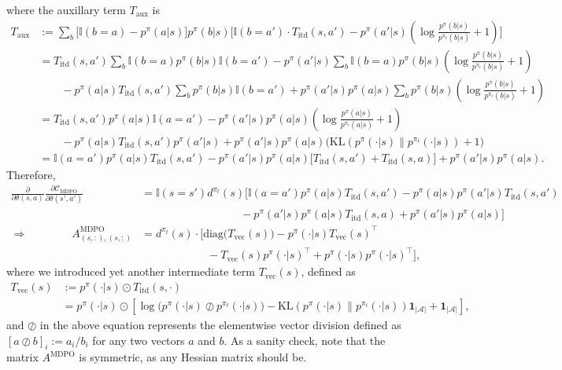 \documentclass[a4paper, 10pt]{article}
\begin{document}
where the auxillary term $T_{\text{aux}}$ is 
\begin{align}
  T_{\text{aux}} &:= \sum_b \Big[ \mathbb{I}(b = a) - p^\pi(a | s) \Big] p^\pi(b | s) \Bigg[ \mathbb{I}(b = a') \cdot T_{\text{itd}}(s, a') - p^\pi(a' | s) \left( \log \frac{p^\pi(b | s)}{p^{\pi_t}(b | s)} + 1 \right) \Bigg] \\
  &= T_{\text{itd}}(s, a') \sum_{b} \mathbb{I}(b = a) p^\pi(b | s) \mathbb{I}(b = a') - p^\pi(a' | s) \sum_{b} \mathbb{I}(b = a) p^\pi(b | s) \left( \log \frac{p^\pi(b | s)}{p^{\pi_t}(b | s)} + 1 \right) \nonumber \\
  & \qquad - p^\pi(a | s) T_{\text{itd}}(s, a') \sum_{b} p^\pi(b | s) \mathbb{I}(b = a') + p^\pi(a' | s) p^\pi(a | s) \sum_{b} p^\pi(b | s) \left( \log \frac{p^\pi(b | s)}{p^{\pi_t}(b | s)} + 1 \right) \nonumber \\  
  &= T_{\text{itd}}(s, a') p^\pi(a | s) \mathbb{I}(a = a') - p^\pi(a' | s) p^\pi(a | s) \left( \log \frac{p^\pi(a | s)}{p^{\pi_t}(a | s)} + 1 \right) \nonumber \\
  & \qquad - p^\pi(a | s) T_{\text{itd}}(s, a') p^\pi(a' | s) + p^\pi(a' | s) p^\pi(a | s) \Big( \text{KL}( p^\pi(\cdot | s) \| p^{\pi_t}(\cdot | s) ) + 1 \Big) \nonumber \\
  &= \mathbb{I}(a = a') p^\pi(a | s) T_{\text{itd}}(s, a') - p^\pi(a' | s) p^\pi(a | s) \Big[ T_{\text{itd}}(s, a') + T_{\text{itd}}(s, a) \Big] + p^\pi(a' | s) p^\pi(a | s).
\end{align}
Therefore, 
\begin{align}
  \frac{\partial}{\partial \theta(s, a)} \frac{\partial \mathcal{C}_{\text{MDPO}}}{\partial \theta(s', a')} &= \mathbb{I}(s = s') d^{\pi_t}(s) \bigg[ \mathbb{I}(a = a') p^\pi(a | s) T_{\text{itd}}(s, a') - p^\pi(a | s) p^\pi(a' | s) T_{\text{itd}}(s, a') \nonumber \\
    & \qquad \qquad \qquad \qquad \quad - p^\pi(a' | s) p^\pi(a | s) T_{\text{itd}}(s, a) + p^\pi(a' | s) p^\pi(a | s) \bigg] \\
  \Rightarrow \qquad \qquad A^{\text{MDPO}}_{(s, :), (s, :)} &= d^{\pi_t}(s) \cdot \Big[ \text{diag} \big( T_{\text{vec}}(s) \big) - p^{\pi}(\cdot | s) T_{\text{vec}}(s)^\top \nonumber \\
    & \qquad \qquad \qquad - T_{\text{vec}}(s) p^{\pi}(\cdot | s)^\top + p^{\pi}(\cdot | s) p^{\pi}(\cdot | s)^\top \Big],
\end{align}
where we introduced yet another intermediate term $T_{\text{vec}}(s)$, defined as
\begin{align}
  T_{\text{vec}}(s) &:= p^{\pi}(\cdot | s) \odot T_{\text{itd}}(s, \cdot) \\
  &= p^{\pi}(\cdot | s) \odot \left[ \log \Big( p^\pi(\cdot | s) \oslash p^{\pi_t}(\cdot | s) \Big) - \text{KL} (p^\pi(\cdot | s) \| p^{\pi_t}(\cdot | s)) \mathbf{1}_{|\mathcal{A}|} + \mathbf{1}_{|\mathcal{A}|} \right],
\end{align}
and $\oslash$ in the above equation represents the elementwise vector division defined as $[a \oslash b]_i := a_i / b_i$ for any two vectors $a$ and $b$. As a sanity check, note that the matrix $A^{\text{MDPO}}$ is symmetric, as any Hessian matrix should be.
\end{document}
